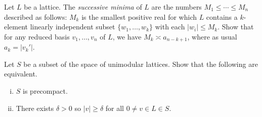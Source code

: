 \documentclass[reqno]{amsart} 
\begin{document}
\begin{exercise}
  Let $L$ be a lattice.  The \emph{successive minima} of $L$ are the numbers $M_1 \leq \dotsb \leq M_n$ described as follows: $M_{k}$ is the smallest positive real for which $L$ contains a $k$-element linearly independent subset $\{w_1,\dotsc,w_k\}$ with each $|w_i| \leq M_k$.  Show that for any reduced basis $v_1,\dotsc,v_n$ of $L$, we have $M_k \asymp a_{n-k+1}$, where as usual $a_k = |v_k'|$.
\end{exercise}



\begin{exercise}\label{thm:mahler-criterion}
  Let $S$ be a subset of the space of unimodular lattices.  Show that the following are equivalent.
  \begin{enumerate}
    [(i)]
  \item $S$ is precompact.
  \item There exists $\delta > 0$ so $|v| \geq \delta$ for all $0 \neq v \in L \in S$.
  \end{enumerate}
\end{exercise}
\end{document}
